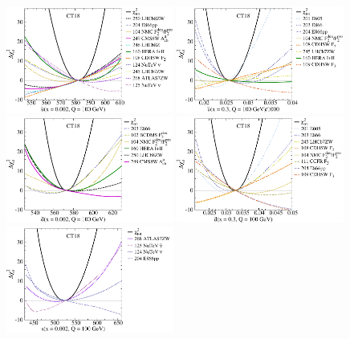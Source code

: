 %
\begin{figure}[p]
	\center
	\includegraphics[width=0.49\textwidth]{./fig/LM/pib23hTnub2E-3p0_0E00_LM27-_-1_x2_00E-03_Q1_00E+02_DEchi2_re0_ect.pdf}%
	\includegraphics[width=0.49\textwidth]{./fig/LM/pib23hTnub3E-1p0_0E00_LM27-_-1_x3_00E-01_Q1_00E+02_DEchi2_re0_ect.pdf}\\ %
	\includegraphics[width=0.49\textwidth]{./fig/LM/pib23hTndb2E-3p0_0E00_LM27-_-2_x2_00E-03_Q1_00E+02_DEchi2_re0_ect.pdf}%
	\includegraphics[width=0.49\textwidth]{./fig/LM/pib23hTndb3E-1p0_0E00_LM27-_-2_x3_00E-01_Q1_00E+02_DEchi2_re0_ect.pdf}\\ %
         \includegraphics[width=0.49\textwidth]{./fig/LM/pib23hTns2E-3p0_0E00_LM27-__3_x2_00E-03_Q1_00E+02_DEchi2_re0_ect.pdf} %

\end{figure}
